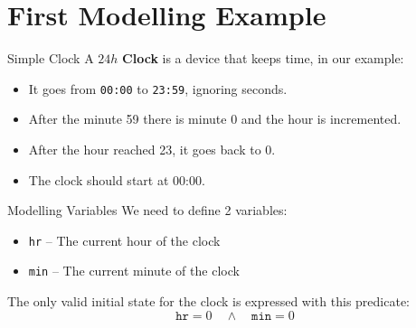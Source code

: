 \section[image=bgphoto_cut]{First Modelling Example}
\begin{frame}[plain]{}
    \sectionpage
\end{frame}

\begin{frame}{Simple Clock}
    A $24h$ \textbf{Clock} is a device that keeps time, in our example:
    \begin{itemize}
        \item<1-> It goes from \texttt{00:00} to \texttt{23:59}, ignoring seconds.
        \item<2-> After the minute 59 there is minute 0 and the hour is incremented.
        \item<2-> After the hour reached 23, it goes back to 0.
        \item<3-> The clock should start at 00:00.
    \end{itemize}
\end{frame}

\begin{frame}{Modelling Variables}
    We need to define 2 variables:
    \begin{itemize}[<+->]
        \item \texttt{hr} -- The current hour of the clock
        \item \texttt{min} -- The current minute of the clock\demo
    \end{itemize}
    \onslide<+->
    \vspace{1cm}
    The only valid initial state for the clock is expressed with this predicate:
    \[
        \texttt{hr} = 0 \quad \land \quad \texttt{min} = 0
    \]
    \demo
\end{frame}

